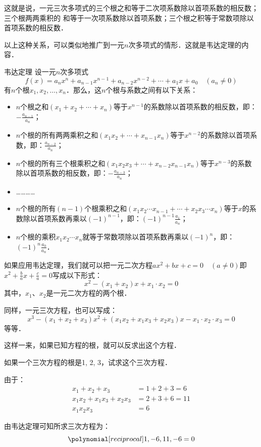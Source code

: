 这就是说，一元三次多项式的三个根之和等于二次项系数除以首项系数的相反数；三个根两两乘积的
和等于一次项系数除以首项系数；三个根之积等于常数项除以首项系数的相反数．

以上这种关系，可以类似地推广到一元$n$次多项式的情形．这就是韦达定理的内容．

\begin{blk}{韦达定理}
设一元$n$次多项式$$f(x)=a_nx^n+a_{n-1}x^{n-1}+a_{n-2}x^{n-2}+\cdots+a_1x+a_0\quad (a_n\ne 0)$$
有$n$个根$x_1,x_2,\ldots,x_n$．那么，这$n$个根与系数之间有以下关系：
\begin{itemize}
    \item $n$个根之和$(x_1+x_2+\cdots+x_n)$等于$x^{n-1}$的系数除以首项系数的相反数，即：$
    -\frac{a_{n-1}}{a_n}$；
    \item $n$个根的所有两两乘积之和$(x_1x_2+\cdots+x_{n-1}x_n)$等于$x^{n-2}$的系数除以首项系数，即：$
    \frac{a_{n-2}}{a_n}$；
    \item $n$个根的所有三个根乘积之和$(x_1x_2x_3+\cdots+x_{n-2}x_{n-1}x_n)$等于$x^{n-3}$的系数除以首项系数的相反数，即：$-\frac{a_{n-3}}{a_n}$；
    \item …………
    \item $n$个根的所有$(n-1)$个根乘积之和$(x_1x_2\cdots x_{n-1} +\cdots+ x_2x_3\cdots x_n)$等于$x$的系数除以首项系数再乘以$(-1)^{n-1}$，即：$ (-1)^{n-1}\frac{a_{1}}{a_n}$；
    \item $n$个根的乘积$x_1x_2\cdots x_n$就等于常数项除以首项系数再乘以$(-1)^{n}$，即：$ (-1)^{n}\frac{a_{0}}{a_n}$．
\end{itemize}
\end{blk}

如果应用韦达定理，我们就可以把一元二次方程$ax^2+bx+c=0\quad (a\ne 0)$即 $x^2+\frac{b}{a}x+\frac{c}{a}=0$写成以下形式：
\[x^2- (x_1+x_2) x+x_1\cdot x_2=0\]
其中，$x_1$、$x_2$是一元二次方程的两个根．

同样，一元三次方程，也可以写成：
\[x^3-(x_1+x_2+x_3)x^2+(x_1x_2+x_1x_3+x_2x_3)x
-x_1\cdot x_2\cdot x_3=0\]
等等．

这样一来，如果已知方程的根，就可以反求出这个方程．

\begin{example}
    如果一个三次方程的根是1, 2, 3，试求这个三次方程．
\end{example}

\begin{solution}
由于：\[\begin{split}
    x_1+x_2+x_3 &=1+2+3=6\\
    x_1x_2+x_1x_3+x_2x_3&=2+3+6=11\\
    x_1x_2x_3&=6
\end{split}\]

由韦达定理可知所求三次方程为：
\[\poly{1,-6,11,-6}=0\]
\end{solution}

